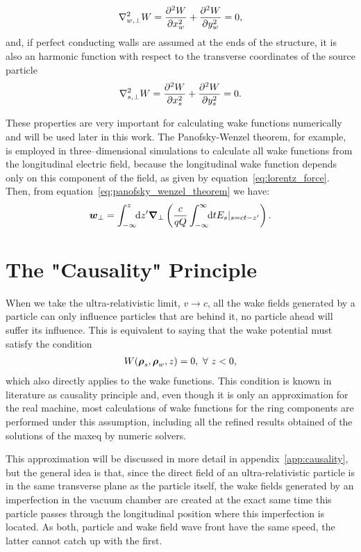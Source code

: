    \begin{align}\label{eq:potential_harmonic}
  	  	\nabla^2_{w,\perp} W = \derpar[2]{W}{x_w} + \derpar[2]{W}{y_w} = 0,
    \end{align}
    and, if perfect conducting walls are assumed at the ends of the structure, it is also an harmonic function with respect to the transverse coordinates of the source particle~\cite{Zagorodnov2015}
    \begin{align}\label{eq:potential_harmonic_source}
  	  	\nabla^2_{s,\perp} W = \derpar[2]{W}{x_s} + \derpar[2]{W}{y_s} = 0.
    \end{align}

    These properties are very important for calculating wake functions numerically and will be used later in this work. The Panofsky-Wenzel theorem, for example, is employed in three--dimensional simulations to calculate all wake functions from the longitudinal electric field, because the longitudinal wake function depends only on this component of the field, as given by equation~\eqref{eq:lorentz_force}. Then, from equation~\eqref{eq:panofsky_wenzel_theorem} we have:
    \begin{align}
  	  	\vect{w}_\perp = \defint{z'}{\vect{\nabla}_\perp\left(\frac{c}{qQ}\infint{t}{E_s|_{s=ct-z'}}\right)}{-\infty}{z}.
    \end{align}

\section{The "Causality" Principle}

    When we take the ultra-relativistic limit, $v \to c$, all the wake fields generated by a particle can only influence particles that are behind it, no particle ahead will suffer its influence. This is equivalent to saying that the wake potential must satisfy the condition
    \begin{align}
  	  	W(\vect{\rho}_s, \vect{\rho}_w, z) = 0, \,\,  \forall\,\, z < 0,
    \end{align}
    which also directly applies to the wake functions. This condition is known in literature as causality principle and, even though it is only an approximation for the real machine, most calculations of wake functions for the ring components are performed under this assumption, including all the refined results obtained of the solutions of the \gls{maxeq} by numeric solvers.

    This approximation will be discussed in more detail in appendix~\ref{app:causality},  but the general idea is that, since the direct field of an ultra-relativistic particle is in the same transverse plane as the particle itself, the wake fields generated by an imperfection in the vacuum chamber are created at the exact same time this particle passes through the longitudinal position where this imperfection is located. As both, particle and wake field wave front have the same speed, the latter cannot catch up with the first.

